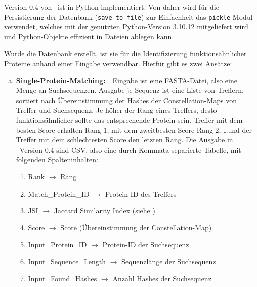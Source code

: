         Version 0.4 von \protfin\ ist in Python implementiert. Von daher wird für die Persistierung der Datenbank (\texttt{save\_to\_file}) zur Einfachheit das \texttt{pickle}-Modul verwendet, welches mit der genutzten Python-Version 3.10.12 mitgeliefert wird und Python-Objekte effizient in Dateien ablegen kann.

        Wurde die Datenbank erstellt, ist sie für die Identifizierung funktionsähnlicher Proteine anhand einer Eingabe verwendbar. Hierfür gibt es zwei Ansätze:
        \begin{enumerate}[a)]
            \item {}
                \textbf{Single-Protein-Matching:}\ \ Eingabe ist eine FASTA-Datei, also eine Menge an Suchsequenzen. Ausgabe je Sequenz ist eine Liste von Treffern, sortiert nach Übereinstimmung der Hashes der Constellation-Maps von Treffer und Suchsequenz. Je höher der Rang eines Treffers, desto funktionsähnlicher sollte das entsprechende Protein sein. Treffer mit dem besten Score erhalten Rang 1, mit dem zweitbesten Score Rang 2, \dots und der Treffer mit dem schlechtesten Score den letzten Rang. Die Ausgabe in \protfin\ Version 0.4 sind \ac{CSV}, also eine durch Kommata separierte Tabelle, mit folgenden Spalteninhalten:
                \begin{enumerate}[1.]
                    \item Rank $\rightarrow$ Rang
                    \item Match\_Protein\_ID $\rightarrow$ Protein-ID des Treffers
                    \item JSI $\rightarrow$ Jaccard Similarity Index (siehe )
                    \item Score $\rightarrow$ Score (Übereinstimmung der Constellation-Map)
                    \item Input\_Protein\_ID $\rightarrow$ Protein-ID der Suchsequenz
                    \item Input\_Sequence\_Length $\rightarrow$ Sequenzlänge der Suchsequenz
                    \item Input\_Found\_Hashes $\rightarrow$ Anzahl Hashes der Suchsequenz
                \end{enumerate}


\end{enumerate}
